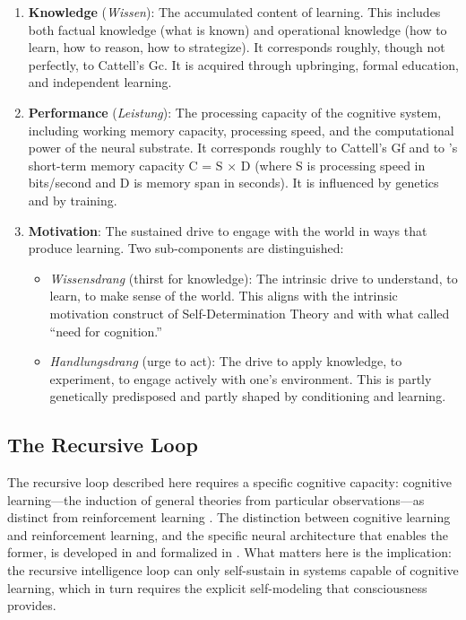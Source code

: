 \documentclass[12pt,a4paper]{article}
\begin{document}
\begin{enumerate}
\item \textbf{Knowledge} (\emph{Wissen}): The accumulated content of learning. This includes both factual knowledge (what is known) and operational knowledge (how to learn, how to reason, how to strategize). It corresponds roughly, though not perfectly, to Cattell's Gc. It is acquired through upbringing, formal education, and independent learning.

\item \textbf{Performance} (\emph{Leistung}): The processing capacity of the cognitive system, including working memory capacity, processing speed, and the computational power of the neural substrate. It corresponds roughly to Cattell's Gf and to \citeauthor{Frank1959}'s \citeyearpar{Frank1959} short-term memory capacity C = S × D (where S is processing speed in bits/second and D is memory span in seconds). It is influenced by genetics and by training.

\item \textbf{Motivation}: The sustained drive to engage with the world in ways that produce learning. Two sub-components are distinguished:
\begin{itemize}
\item \emph{Wissensdrang} (thirst for knowledge): The intrinsic drive to understand, to learn, to make sense of the world. This aligns with the intrinsic motivation construct of Self-Determination Theory \citep{DeciRyan2000} and with what \citet{Cacioppo1996} called ``need for cognition.''
\item \emph{Handlungsdrang} (urge to act): The drive to apply knowledge, to experiment, to engage actively with one's environment. This is partly genetically predisposed and partly shaped by conditioning and learning.
\end{itemize}
\end{enumerate}

\subsection{The Recursive Loop}

The recursive loop described here requires a specific cognitive capacity: cognitive learning---\hspace{0pt}the induction of general theories from particular observations---\hspace{0pt}as distinct from reinforcement learning \citep{Gruber2015}. The distinction between cognitive learning and reinforcement learning, and the specific neural architecture that enables the former, is developed in \citet{Gruber2015} and formalized in \citet{Gruber2026}. What matters here is the implication: the recursive intelligence loop can only self-sustain in systems capable of cognitive learning, which in turn requires the explicit self-modeling that consciousness provides.
\end{document}
